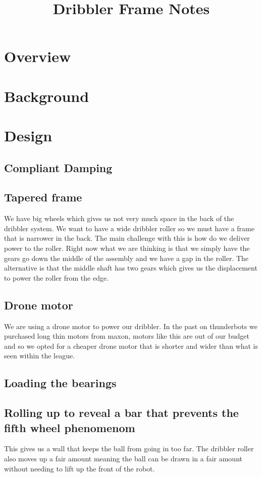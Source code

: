 \documentclass{article}
\begin{document}
\title{Dribbler Frame Notes}

\section{Overview}

\section{Background}

\section{Design}
\subsection{Compliant Damping}

\subsection{Tapered frame}
We have big wheels which gives us not very much space in the back of the dribbler system. We want to have a wide dribbler roller so we must have a frame that is narrower in the back. The main challenge with this is how do we deliver power to the roller. Right now what we are thinking is that we simply have the gears go down the middle of the assembly and we have a gap in the roller. The alternative is that the middle shaft has two gears which gives us the displacement to power the roller from the edge.

\subsection{Drone motor}
We are using a drone motor to power our dribbler. In the past on thunderbots we purchased long thin motors from maxon, motors like this are out of our budget and so we opted for a cheaper drone motor that is shorter and wider than what is seen within the league.

\subsection{Loading the bearings}

\subsection{Rolling up to reveal a bar that prevents the fifth wheel phenomenom}
This gives us a wall that keeps the ball from going in too far. The dribbler roller also moves up a fair amount meaning the ball can be drawn in a fair amount without needing to lift up the front of the robot.
\end{document}
